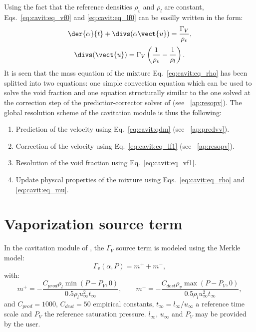 Using the fact that the reference densities $\rho_v$ and $\rho_l$ are
constant, Eqs.~\eqref{eq:cavit:eq_vf0} and \eqref{eq:cavit:eq_lf0} can be easilly
written in the form:
\begin{equation}
\label{eq:cavit:eq_vf1}
\der{\alpha}{t} + \divs(\alpha\vect{u}) =
\dfrac{\Gamma_V}{\rho_v},
\end{equation}
%
\begin{equation}
\label{eq:cavit:eq_lf1}
\divs(\vect{u})=\Gamma_V\left(\frac{1}{\rho_v}-\frac{1}{\rho_l}\right).
\end{equation}
It is seen that the mass equation of the mixture Eq.~\eqref{eq:cavit:eq_rho}
has been splitted into two equations: one simple convection equation
which can be used to solve the void fraction and one equation
structurally similar to the one solved at the correction step of the
predictior-corrector solver of \CS (see \appendixname~\ref{ap:resopv}).
The global resolution scheme of the cavitation module is thus the
following:
\begin{enumerate}
\item Prediction of the velocity using Eq.~\eqref{eq:cavit:qdm} (see
\appendixname~\ref{ap:predvv}).
\item Correction of the velocity using Eq.~\eqref{eq:cavit:eq_lf1} (see
\appendixname~\ref{ap:resopv}).
\item Resolution of the void fraction using Eq.~\eqref{eq:cavit:eq_vf1}.
\item Update physcal properties of the mixture using
Eqs.~\eqref{eq:cavit:eq_rho} and \eqref{eq:cavit:eq_mu}.
\end{enumerate}
%
\section{Vaporization source term}
\label{sec:cavit:source_term}
In the cavitation module of \CS, the $\Gamma_V$ source term is
modeled using the Merkle model:
\begin{equation*}
\Gamma_v \left(\alpha, P\right) = m^+ + m^-,
\end{equation*}
 with:
\begin{equation}
m^+ = -\dfrac{C_{prod} \rho_l \min \left( P-P_V,0
\right)}{0.5\rho_lu_\infty^2t_\infty},\qquad
m^- = -\dfrac{C_{dest} \rho_v \max \left( P-P_V,0
\right)}{0.5\rho_lu_\infty^2t_\infty},
\end{equation}
and
$ C_{prod} = 1000, \, C_{dest} = 50 $
empirical constants, $t_\infty=l_\infty/u_\infty$ a reference time
scale and $P_V$ the reference saturation pressure. $l_\infty$,
$u_\infty$ and $P_V$ may be provided by the user.
%

